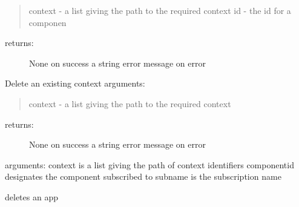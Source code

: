\documentclass[letterpaper,10pt,english]{sphinxmanual}
\begin{document}
\begin{fulllineitems}
\begin{fulllineitems}
\begin{quote}
context - a list giving the path to the required context
id - the id for a componen
\end{quote}
\begin{description}
\item[{returns:}] \leavevmode
None on success
a string error message on error

\end{description}

\end{fulllineitems}


\begin{fulllineitems}
\label{personis.client:personis.client.Access.delcontext}
Delete an existing context
arguments:
\begin{quote}

context - a list giving the path to the required context
\end{quote}
\begin{description}
\item[{returns:}] \leavevmode
None on success
a string error message on error

\end{description}

\end{fulllineitems}


\begin{fulllineitems}
\label{personis.client:personis.client.Access.delete_sub}
arguments:
context is a list giving the path of context identifiers
componentid designates the component subscribed to
subname is the subscription name

\end{fulllineitems}


\begin{fulllineitems}
\label{personis.client:personis.client.Access.deleteapp}
deletes an app

\end{fulllineitems}


\end{fulllineitems}
\end{document}
